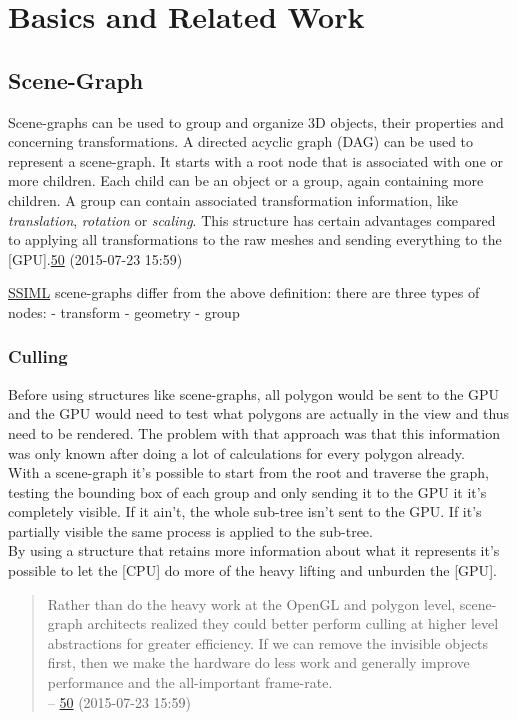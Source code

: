 \section{Basics and Related Work}
\label{basics-and-related-work}

\subsection{Scene-Graph}\label{scene-graph}

Scene-graphs can be used to group and organize 3D objects, their
properties and concerning transformations. A directed acyclic graph
(DAG) can be used to represent a scene-graph. It starts with a root node
that is associated with one or more children. Each child can be an
object or a group, again containing more children. A group can contain
associated transformation information, like \emph{translation},
\emph{rotation} or \emph{scaling}. This structure has certain advantages
compared to applying all transformations to the raw meshes and sending
everything to the
{[}GPU{]}.\href{http://www.realityprime.com/blog/2007/06/scenegraphs-past-present-and-future/}{50}
(2015-07-23 15:59)

\hyperref[ssiml]{SSIML} scene-graphs differ from the above definition:
there are three types of nodes: - transform - geometry - group

\subsubsection{Culling}\label{culling}

Before using structures like scene-graphs, all polygon would be sent to
the GPU and the GPU would need to test what polygons are actually in the
view and thus need to be rendered. The problem with that approach was
that this information was only known after doing a lot of calculations
for every polygon already.\\
With a scene-graph it's possible to start from the root and traverse the
graph, testing the bounding box of each group and only sending it to the
GPU it it's completely visible. If it ain't, the whole sub-tree isn't
sent to the GPU. If it's partially visible the same process is applied
to the sub-tree.\\
By using a structure that retains more information about what it
represents it's possible to let the {[}CPU{]} do more of the heavy
lifting and unburden the {[}GPU{]}.

\begin{quote}
Rather than do the heavy work at the OpenGL and polygon level,
scene-graph architects realized they could better perform culling at
higher level abstractions for greater efficiency. If we can remove the
invisible objects first, then we make the hardware do less work and
generally improve performance and the all-important frame-rate.\\
--
\href{http://www.realityprime.com/blog/2007/06/scenegraphs-past-present-and-future/}{50}
(2015-07-23 15:59)
\end{quote}

